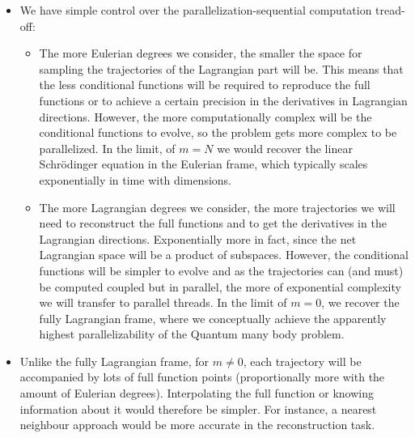 \documentclass[11pt, a4paper]{article} %
\begin{document}
\begin{itemize}
\item We have simple control over the parallelization-sequential computation tread-off:

\begin{itemize}
\item The more Eulerian degrees we consider, the smaller the space for sampling the trajectories of the Lagrangian part will be. This means that the less conditional functions will be required to reproduce the full functions or to achieve a certain precision in the derivatives in Lagrangian directions. However, the more computationally complex will be the conditional functions to evolve, so the problem gets more complex to be parallelized. In the limit, of $m=N$ we would recover the linear Schrödinger equation in the Eulerian frame, which typically scales exponentially in time with dimensions.

\item The more Lagrangian degrees we consider, the more trajectories we will need to reconstruct the full functions and to get the derivatives in the Lagrangian directions. Exponentially more in fact, since the net Lagrangian space will be a product of subspaces. However, the conditional functions will be simpler to evolve and as the trajectories can (and must) be computed coupled but in parallel, the more of exponential complexity we will transfer to parallel threads. In the limit of $m=0$, we recover the fully Lagrangian frame, where we conceptually achieve the apparently highest parallelizability of the Quantum many body problem.
\end{itemize} 



\item Unlike the fully Lagrangian frame, for $m\neq 0$, each trajectory will be accompanied by lots of full function points (proportionally more with the amount of Eulerian degrees). Interpolating the full function or knowing information about it would therefore be simpler. For instance, a nearest neighbour approach would be more accurate in the reconstruction task.


\end{itemize}
\end{document}
